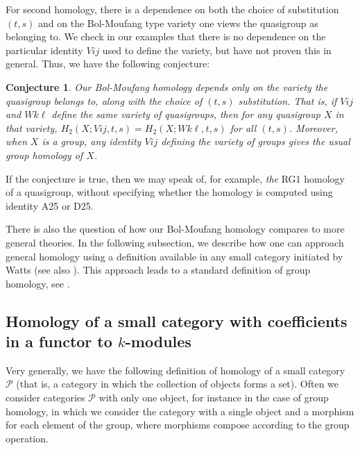 \documentclass[11pt]{amsart}
\newtheorem{conjecture}[theorem]{Conjecture}
\theoremstyle{definition}
\begin{document}
For second homology, there is a dependence on both the choice of substitution $(t,s)$ and on the Bol-Moufang type variety one views the quasigroup as belonging to. We check in our examples that there is no dependence on the particular identity $Vij$ used to define the variety, but have not proven this in general. Thus, we have the following conjecture: 


\begin{conjecture}\label{conj:identity-independence}
    Our Bol-Moufang homology depends only on the variety the quasigroup belongs to, along with the choice of $(t,s)$ substitution. That is, if $Vij$ and $Wk\ell$ define the same variety of quasigroups, then for any quasigroup $X$ in that variety, $H_2(X;Vij,t,s) = H_2(X;Wk\ell,t,s)$ for all $(t,s)$. Moreover, when $X$ is a group, any identity $Vij$ defining the variety of groups gives the usual group homology of $X$. 
\end{conjecture}

If the conjecture is true, then we may speak of, for example, {\it the} RG1 homology of a quasigroup, without specifying whether the homology is computed using identity A25 or D25. 

There is also the question of how our Bol-Moufang homology compares to more general theories. In the following subsection, we describe how one can approach general homology using a definition available in any small category initiated by Watts \cite{Wat} (see also \cite{Lod, PrWan}). This approach leads to a standard definition of group homology, see \cite{Lod}. 
\color{black}

\subsection{Homology of a small category with coefficients in a functor to $k$-modules}



Very generally, we have the following definition of homology of a small category $\mathcal{P}$ (that is, a category in which the collection of objects forms a set). Often we consider categories $\mathcal{P}$ with only one object, for instance in the case of group homology, in which we consider the category with a single object and a morphism for each element of the group, where morphisms compose according to the group operation. 
\end{document}

